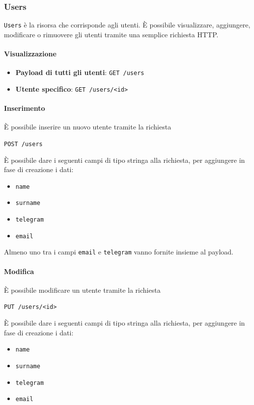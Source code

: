 \subsubsection{Users}

\texttt{Users} è la risorsa che corrisponde agli utenti.
È possibile visualizzare, aggiungere, modificare o rimuovere gli utenti tramite una semplice
richiesta HTTP.

\paragraph{Visualizzazione}

\begin{itemize}
    \item \textbf{Payload di tutti gli utenti}: \texttt{GET /users}
    \item \textbf{Utente specifico}: \texttt{GET /users/<id>}
\end{itemize}

\paragraph{Inserimento}
È possibile inserire un nuovo utente tramite la richiesta
    \begin{center}
        \texttt{POST /users}
    \end{center}

È possibile dare i seguenti campi di tipo stringa alla richiesta, per aggiungere in fase di creazione
i dati:
\begin{itemize}[noitemsep]
    \item \texttt{name}
    \item \texttt{surname}
    \item \texttt{telegram}
    \item \texttt{email}
\end{itemize}
Almeno uno tra i campi \texttt{email} e \texttt{telegram} vanno fornite insieme al payload.


\paragraph{Modifica}

È possibile modificare un utente tramite la richiesta
\begin{center}
    \texttt{PUT /users/<id>}
\end{center}
È possibile dare i seguenti campi di tipo stringa alla richiesta, per aggiungere in fase di creazione
i dati:
\begin{itemize}[noitemsep]
    \item \texttt{name}
    \item \texttt{surname}
    \item \texttt{telegram}
    \item \texttt{email}
\end{itemize}



